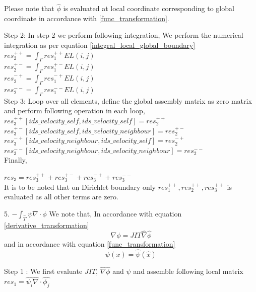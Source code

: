 \documentclass[a4paper]{book}
\begin{document}
Please note that $\hat{\phi}$ is evaluated at local coordinate corresponding to global coordinate in accordance with \ref{func_transformation}.

Step 2: In step 2 we perform following integration, 
We perform the numerical integration as per equation \ref{integral_local_global_boundary}
\\ 
$res_2^{++} = \int_{\Gamma} res_1^{++} EL(i,j)$\\
$res_2^{+-} = \int_{\Gamma} res_1^{+-} EL(i,j)$\\
$res_2^{-+} = \int_{\Gamma} res_1^{-+} EL(i,j)$\\
$res_2^{--} = \int_{\Gamma} res_1^{--} EL(i,j)$\\

Step 3: Loop over all elements, define the global assembly matrix as zero matrix and perform following operation in each loop,
\\
$res_3^{++}[ids\_velocity\_self,ids\_velocity\_self] = res_2^{++}$\\
$res_3^{+-}[ids\_velocity\_self,ids\_velocity\_neighbour] = res_2^{+-}$\\
$res_3^{-+}[ids\_velocity\_neighbour,ids\_velocity\_self] = res_2^{-+}$\\
$res_3^{--}[ids\_velocity\_neighbour,ids\_velocity\_neighbour] = res_2^{--}$\\

Finally,

$res_3 = res_3^{++} + res_3^{+-} + res_3^{-+} + res_3^{--}$\\

It is to be noted that on Dirichlet boundary only $res_1^{++}, res_2^{++}, res_3^{++}$ is evaluated as all other terms are zero.

5. $-\int_{\hat{T}} \psi \nabla \cdot \phi$
We note that, In accordance with equation \ref{derivative_transformation}
\begin{equation}
\nabla \phi = JIT \hat{\nabla} \hat{\phi}
\end{equation}
and in accordance with equation \ref{func_transformation}
\begin{equation}
\psi(x) = \hat{\psi} (\hat{x})
\end{equation}

Step 1 : We first evaluate $JIT$, $\hat{\nabla} \hat{\phi}$ and $\psi$ and assemble following local matrix\\
$res_1 = \hat{\psi_i} \hat{\nabla} \cdot \hat{\phi_j}$\\
\end{document}

